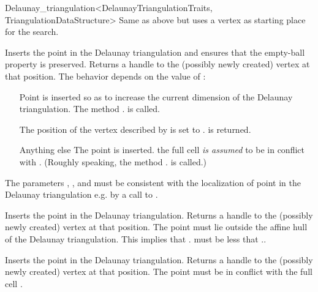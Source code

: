 \begin{ccRefClass}{Delaunay_triangulation<DelaunayTriangulationTraits, TriangulationDataStructure>}
%
{Same as above but uses a vertex as starting place for the search.}

\begin{ccAdvanced}

{Inserts the point  in the Delaunay triangulation
and ensures that the empty-ball property is preserved.
Returns a handle to the
(possibly newly created) vertex at that position. The behavior depends on the
value of :\begin{itemize} \item[\ccc{OUTSIDE_AFFINE_HULL}] Point
 is inserted so as to increase the current dimension of the Delaunay
triangulation. The method \ccVar. is called.
\item[\ccc{ON_VERTEX}] The position of the vertex  described by 
is set to .  is returned. \item[Anything else] The point 
is inserted. the full cell   {\em is assumed} to be in conflict
with .
(Roughly speaking, the method \ccVar.
is called.)\end{itemize} 
The parameters , , 
and  must be consistent with the localization of point  in the
Delaunay triangulation e.g. by a call to
.}

{Inserts the point  in the Delaunay triangulation. Returns a handle to the
(possibly newly created) vertex at that position. \ccPrecond The point 
must lie outside the affine hull of the Delaunay triangulation. This implies that
\ccVar. must be less that
\ccVar..}

{Inserts the point  in the Delaunay triangulation. Returns a handle to the
(possibly newly created) vertex at that position.
\ccPrecond The point 
must be in conflict with the full cell .}

\end{ccAdvanced}



\end{ccRefClass}
